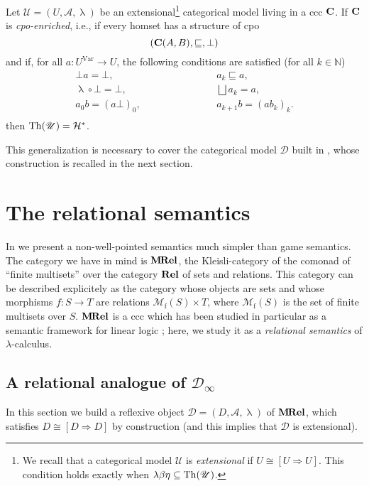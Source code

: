 \documentclass[english]{llncs}
\renewcommand{\bold}[1]{{\bf #1}}
\newcommand{\sqle}{\sqsubseteq}
\newcommand{\Var}{\mathrm{Var}}
\newcommand{\Mfin}[1]{\mathcal{M}_\mathrm{f}( #1 )}
\renewcommand{\sup}[1]{\bigsqcup #1}
\newcommand{\cat}[1]{\bold{#1}}
\newcommand{\Rel}{\bold{Rel}}
\newcommand{\MRel}{\bold{M\hspace{-1pt}Rel}}
\newcommand{\Funint}[2]{[{#1}\To{#2}]}
\newcommand{\To}{\Rightarrow}
\newcommand{\ro}[1]{\mathscr{#1}} \newcommand{\App}{\mathcal{A}}
\newcommand{\Abs}{\uplambda}
\newcommand{\comp}{\circ}
\newcommand{\cH}{{\cal H}}
\newcommand{\nat}{\mathbb{N}}
\begin{document}
\begin{theorem}\label{thm: a model of H*}\cite[Thm.~2.3.35]{ManzonettoTh}
Let $\ro{U} = (U,\App,\Abs)$ be an extensional\footnote{
We recall that a categorical model $\ro{U}$ is {\em extensional} if $U\cong\Funint UU$.
This condition holds exactly when $\lambda\beta\eta\subseteq\Th{\ro{U}}$.} categorical model living in a ccc $\cat C$.
If $\cat C$ is {\em cpo-enriched}, i.e., if every homset has a structure of cpo
$$
    (\cat C(A,B),\sqle,\bot)
$$
and if, for all $a : U^\Var\to U$, the following conditions are satisfied (for all $k\in\nat$)
$$
\begin{array}{lcl}
\bot a = \bot,         & \qquad \qquad \qquad & a_k\sqle a,\\
\Abs\comp \bot = \bot, &        & \sup a_k = a,\\
a_0b = (a\bot)_0,      &        & a_{k+1}b = (ab_k)_k.\\
\end{array}
$$
then $\Th{\ro{U}} = \cH^*$.
\end{theorem}

This generalization is necessary to cover the categorical model $\ro{D}$ built in \cite[Chapter~2]{ManzonettoTh},
whose construction is recalled in the next section.




\section{The relational semantics}\label{sec:The relational semantics}

In \cite[Chapter~3]{ManzonettoTh}  we present a non-well-pointed semantics much simpler than game semantics. 
The category we have in mind is $\MRel$, the Kleisli-category of the comonad of ``finite multisets'' over the category $\Rel$ of sets and relations.
This category can be described explicitely as the category whose objects are sets and whose morphisms $f:S\to T$ are relations $\Mfin{S}\times T$, 
where $\Mfin S$ is the set of finite multisets over $S$.
$\MRel$ is a ccc which has been studied in particular as a semantic framework for linear logic \cite{Girard88,BucciarelliE01};
here, we study it as a {\em relational semantics} of $\lambda$-calculus.

\subsection{A relational analogue of $\ro{D}_\infty$}

In this section we build a reflexive object $\ro{D} = (D,\App,\Abs)$ of $\MRel$, which satisfies $D\cong \Funint DD$ by construction 
(and this implies that $\ro{D}$ is extensional). 
\end{document}

